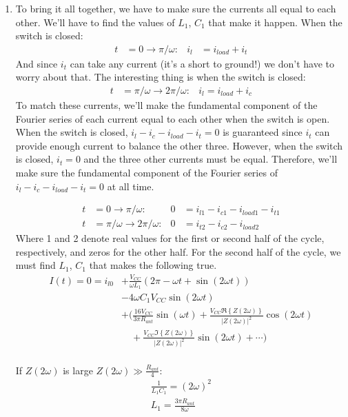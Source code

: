\documentclass[10pt,letterpaper]{article}
\begin{document}
\begin{enumerate}
\item To bring it all together, we have to make sure the currents all equal to each other. We'll have to find the values of $L_1$, $C_1$ that make it happen. When the switch is closed:
\begin{align*}
t&=0\rightarrow \pi/\omega: &i_l&=i_{load}+i_t
\end{align*}
And since $i_t$ can take any current (it's a short to ground!) we don't have to worry about that. The interesting thing is when the switch is closed:
\begin{align*}
t&=\pi/\omega\rightarrow 2\pi/\omega: &i_l=i_{load}+i_c
\end{align*}
To match these currents, we'll make the fundamental component of the Fourier series of each current equal to each other when the switch is open. When the switch is closed, $i_l-i_c-i_{load}-i_t=0$ is guaranteed since  $i_t$ can provide enough current to balance the other three. However, when the switch is closed, $i_t=0$ and the three other currents must be equal. Therefore, we'll make sure the fundamental component of the Fourier series of $i_l-i_c-i_{load}-i_t=0$ at all time.

\begin{align*}
t&=0\rightarrow\pi/\omega: &0&=i_{l1}-i_{c1}-i_{load1}-i_{t1}\\
t&=\pi/\omega\rightarrow 2\pi/\omega: &0&=i_{t2}-i_{c2}-i_{load2}
\end{align*}
Where 1 and 2 denote real values for the first or second half of the cycle, respectively, and zeros for the other half. For the second half of the cycle, we must find $L_1$, $C_1$ that makes the following true.
\begin{align*}
I(t)=0=i_{l0}&+\frac{V_{CC}}{\omega L_1}\left(2\pi-\omega t+\sin(2\omega t)\right)\\
&-4\omega C_1 V_{CC}\sin(2 \omega t)\\
&+\Big( \frac{16V_{CC}}{3\pi R_{ant}}\sin(\omega t)+\frac{V_{CC}\Re\left\{Z(2\omega)\right\}}{|Z(2\omega)|^2}\cos(2\omega t)\\
&\quad +\frac{V_{CC}\Im\left\{Z(2\omega)\right\}}{|Z(2\omega)|^2}\sin(2\omega t)+\cdots \Big)\\
\end{align*}



If $Z(2\omega)$ is large $Z(2\omega)\gg\frac{R_{ant}}{4}$:
\begin{align*}
\frac{1}{L_1C_1}=(2\omega)^2\\
L_1=\frac{3 \pi R_{ant} }{8\omega}
\end{align*}


\end{enumerate}
\end{document}
